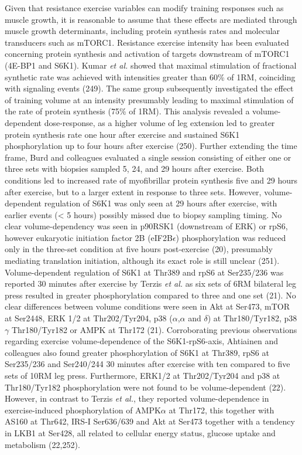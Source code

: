 \documentclass[twoside,10pt]{gihclass} %
\begin{document}
Given that resistance exercise variables can modify training responses such as muscle growth, it is reasonable to assume that these effects are mediated through muscle growth determinants, including protein synthesis rates and molecular transducers such as mTORC1.
Resistance exercise intensity has been evaluated concerning protein synthesis and activation of targets downstream of mTORC1 (4E-BP1 and S6K1).
Kumar \emph{et al.} showed that maximal stimulation of fractional synthetic rate was achieved with intensities greater than 60\% of 1RM, coinciding with signaling events
(249).
The same group subsequently investigated the effect of training volume at an intensity presumably leading to maximal stimulation of the rate of protein synthesis (75\% of 1RM).
This analysis revealed a volume-dependent dose-response, as a higher volume of leg extension led to greater protein synthesis rate one hour after exercise and sustained S6K1 phosphorylation up to four hours after exercise
(250).
Further extending the time frame, Burd and colleagues evaluated a single session consisting of either one or three sets with biopsies sampled 5, 24, and 29 hours after exercise. Both conditions led to increased rate of myofibrillar protein synthesis five and 29 hours after exercise, but to a larger extent in response to three sets.
However, volume-dependent regulation of S6K1 was only seen at 29 hours after exercise, with earlier events (\textless{} 5 hours) possibly missed due to biopsy sampling timing.
No clear volume-dependency was seen in p90RSK1 (downstream of ERK) or rpS6, however eukaryotic initiation factor 2B (eIF2B\(\epsilon\)) phosphorylation was reduced only in the three-set condition at five hours post-exercise (20), presumably mediating translation initiation, although its exact role is still unclear
(251).
Volume-dependent regulation of S6K1 at Thr389 and rpS6 at Ser235/236 was reported 30 minutes after exercise by Terzis \emph{et al.} as six sets of 6RM bilateral leg press resulted in greater phosphorylation compared to three and one set
(21).
No clear differences between volume conditions were seen in Akt at Ser473, mTOR at Ser2448, ERK 1/2 at Thr202/Tyr204, p38 (\(\alpha\),\(\alpha\) and \(\delta\)) at Thr180/Tyr182, p38\(\gamma\) Thr180/Tyr182 or AMPK at Thr172
(21).
Corroborating previous observations regarding exercise volume-dependence of the S6K1-rpS6-axis, Ahtiainen and colleagues also found greater phosphorylation of S6K1 at Thr389, rpS6 at Ser235/236 and Ser240/244 30 minutes after exercise with ten compared to five sets of 10RM leg press.
Furthermore, ERK1/2 at Thr202/Tyr204 and p38 at Thr180/Tyr182 phosphorylation were not found to be volume-dependent
(22).
However, in contrast to Terzis \emph{et al.}, they reported volume-dependence in exercise-induced phosphorylation of AMPK\(\alpha\) at Thr172, this together with AS160 at Thr642, IRS-I Ser636/639 and Akt at Ser473 together with a tendency in LKB1 at Ser428, all related to cellular energy status, glucose uptake and metabolism
(22,252).
\end{document}
